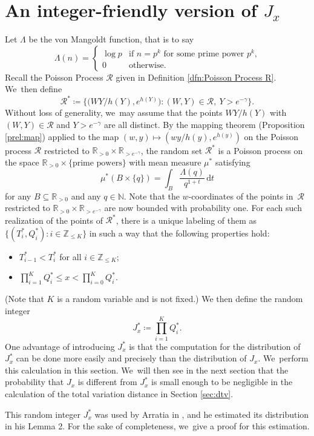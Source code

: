 \documentclass[JEP,XML,SOM,Unicode,published]{cedram}
\newcommand{\NN}{\mathbb{N}}
\newcommand{\ZZ}{\mathbb{Z}}
\newcommand{\RR}{\mathbb{R}}
\newcommand{\RS}{\mathscr{R}}
\newcommand{\bg}{\big}
\theoremstyle{plain}
\theoremstyle{definition}
\begin{document}
\section{An integer-friendly version of \texorpdfstring{$J_x$}{Jx}}
\label{sec:integer friendly J}

Let $\Lambda$ be the von Mangoldt function, that is to say
\[
\Lambda(n) = \begin{cases}
\log p &\text{if $n = p^k$ for some prime power $p^k$,} \\
0 &\text{otherwise.}
\end{cases}
\]
Recall the Poisson Process $\RS$ given in Definition \ref{dfn:Poisson Process R}. We~then define
\[
\RS^* \coloneqq \bg\{ \bg( WY/ h(Y), e^{h(Y)} \bg): (W,Y)\in \RS,\ Y > e^{-\gamma}\bg\}.
\]
Without loss of generality, we~may assume that the points $WY/h(Y)$ with $(W,Y)\in\RS$ and $Y>e^{-\gamma}$ are all distinct. By the mapping theorem (Proposition \ref{prel:map}) applied to the map $(w,y)\mapsto (wy/h(y),e^{h(y)})$ on the Poisson process $\RS$ restricted to $\RR_{>0} \times \RR_{>e^{-\gamma}}$, the random set $\RS^*$ is a Poisson process on the space $\RR_{>0}\times \{\text{prime powers}\}$ with mean measure $\mu^*$ satisfying
\[
\mu^*(B \times \{q\}) = \int_{B} \frac{\Lambda(q)}{q^{1+t}} \, \mathrm dt
\]
for any $B\subseteq\RR_{>0}$ and any $q\in\NN$. Note that the $w$-coordinates of the points in~$\RS$ restricted to $\RR_{>0} \times \RR_{>e^{-\gamma}}$ are now bounded with probability one. For each such realization of the points of $\RS^*$, there is a unique labeling of them as \hbox{$\{(T^*_i, Q^*_i):i \in \ZZ_{\le K}\}$} in such a way that the following properties hold:
\begin{itemize}
\item $T^*_{i-1} <T^*_{i}$ for all $i\in\ZZ_{\le K}$;
\item $\prod_{i=1}^K Q_i^*\le x< \prod_{i=0}^K Q_i^*$.
\end{itemize}
(Note that $K$ is a random variable and is not fixed.) We then define the random integer
\[
J_x^*\coloneqq \prod_{i=1}^K Q^*_i.
\]
One advantage of introducing $J_x^*$ is that the computation for the distribution of $J_x^*$ can be done more easily and precisely than the distribution of $J_x$. We~perform this calculation in this section. We~will then see in the next section that the probability that $J_x$ is different from $J_x^*$ is small enough to be negligible in the calculation of the total variation distance in Section \ref{sec:dtv}.

This random integer $J^*_x$ was used by Arratia in \cite{Arratia02}, and he estimated its distribution in his Lemma 2. For the sake of completeness, we~give a proof for this estimation.
\end{document}
